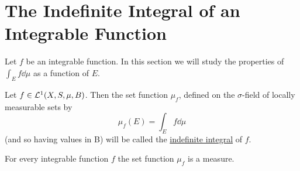 \section{The Indefinite Integral of an Integrable Function}

Let $f$ be an integrable function. In this section we will study the properties of $\int_Ef\dd\mu$ as a function of $E$.

\begin{definition}
Let $f\in{\cal L}^1(X,S,\mu,B)$. Then the set function $\mu_f$, defined on the $\sigma$-field of locally measurable sets by $$\mu_f(E)=\int_Ef\dd\mu$$ (and so having values in B) will be called the \underline{indefinite integral} of $f$.
\end{definition}

\begin{theorem}
\label{thm:indef integral is measure}
For every integrable function $f$ the set function $\mu_f$ is a measure.
\end{theorem}

